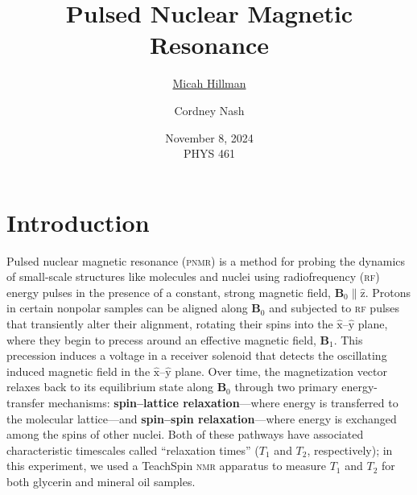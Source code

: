 \documentclass[12pt]{report}
\title{\textbf{Pulsed Nuclear Magnetic Resonance} \\\vspace{-0.6cm}}
\date{
    November 8, 2024 \\\vspace{0.5cm}
    \large{PHYS 461}
}
\author{
    \ul{Micah Hillman} \and Cordney Nash
}
\begin{document}
\maketitle

\section*{Introduction}
{
    Pulsed nuclear magnetic resonance (\textsc{pnmr}) is a method for probing the dynamics of small-scale structures like molecules and nuclei using radiofrequency (\textsc{rf}) energy pulses in the presence of a constant, strong magnetic field, $\bm{B}_0 \parallel \hat{\mathrm{z}}$. Protons in certain nonpolar samples can be aligned along $\bm{B}_0$ and subjected to \textsc{rf} pulses that transiently alter their alignment, rotating their spins into the $\hat{\mathrm{x}}$–$\hat{\mathrm{y}}$ plane, where they begin to precess around an effective magnetic field, $\bm{B}_1$. This precession induces a voltage in a receiver solenoid that detects the oscillating induced magnetic field in the $\hat{\mathrm{x}}$–$\hat{\mathrm{y}}$ plane. Over time, the magnetization vector relaxes back to its equilibrium state along $\bm{B}_0$ through two primary energy-transfer mechanisms: \textbf{spin–lattice relaxation}—where energy is transferred to the molecular lattice—and \textbf{spin–spin relaxation}—where energy is exchanged among the spins of other nuclei. Both of these pathways have associated characteristic timescales called ``relaxation times'' ($T_1$ and $T_2$, respectively); in this experiment, we used a TeachSpin\textsuperscript{\tiny\textregistered} \textsc{nmr} apparatus to measure $T_1$ and $T_2$ for both glycerin and mineral oil samples.
}
\end{document}
